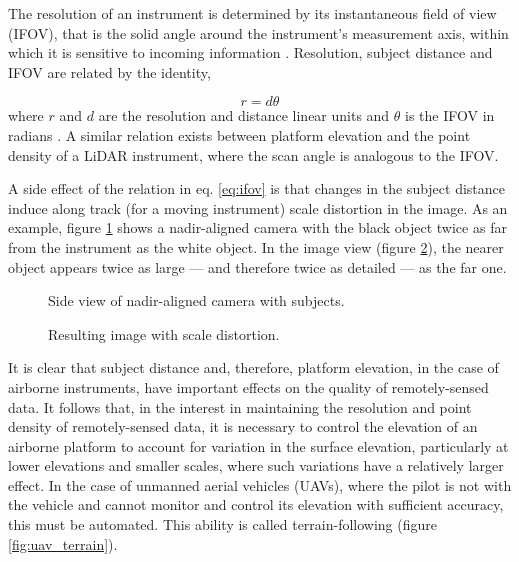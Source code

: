\documentclass[10pt]{report}
\begin{document}
The resolution of an instrument is determined by its instantaneous field of view (IFOV), that is the solid angle around the instrument's measurement axis, within which it is sensitive to incoming information \cite{Lillesand1999}. Resolution, subject distance and IFOV are related by the identity, 

\begin{equation}
r = d \theta
\label{eq:ifov}
\end{equation} 
where $r$ and $d$ are the resolution and distance linear units and $\theta$ is the IFOV in radians \cite{Lillesand1999}. A similar relation exists between platform elevation and the point density of a LiDAR instrument, where the scan angle is analogous to the IFOV. 

A side effect of the relation in eq. \ref{eq:ifov} is that changes in the subject distance induce along track (for a moving instrument) scale distortion in the image. As an example, figure \ref{fig:scale_cam} shows a nadir-aligned camera with the black object twice as far from the instrument as the white object. In the image view (figure \ref{fig:scale_img}), the nearer object appears twice as large --- and therefore twice as detailed --- as the far one. 

\begin{figure}
\centering
\def\svgscale{0.5}

\caption{Side view of nadir-aligned camera with subjects.}
\label{fig:scale_cam}
\end{figure}

\begin{figure}
\centering
\def\svgscale{0.5}

\caption{Resulting image with scale distortion.}
\label{fig:scale_img}
\end{figure}

It is clear that subject distance and, therefore, platform elevation, in the case of airborne instruments, have important effects on the quality of remotely-sensed data. It follows that, in the interest in maintaining the resolution and point density of remotely-sensed data, it is necessary to control the elevation of an airborne platform to account for variation in the surface elevation, particularly at lower elevations and smaller scales, where such variations have a relatively larger effect. In the case of unmanned aerial vehicles (UAVs), where the pilot is not with the vehicle and cannot monitor and control its elevation with sufficient accuracy, this must be automated. This ability is called terrain-following (figure \ref{fig:uav_terrain}).
\end{document}
